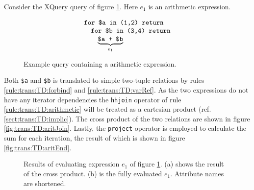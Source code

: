 \begin{myExample}
Consider the XQuery query of figure \ref{fig:trans:TD:arithQuery}. Here $e_1$ is an arithmetic expression.

\begin{figure}[h]
\centering
\begin{equation*}
\begin{array}{l}
\mbox{\texttt{for \$a in (1,2) return}} \\ \quad
\mbox{\texttt{for \$b in (3,4) return}} \\ \quad \quad
\underbrace{\mbox{\texttt{\$a + \$b}}}_{e_1}
\end{array}
\end{equation*}
\caption{Example query containing a arithmetic expression.}
\label{fig:trans:TD:arithQuery}
\end{figure}

Both \texttt{\$a} and \texttt{\$b} is translated to simple two-tuple relations by rules
\ref{rule:trans:TD:forbind} and \ref{rule:trans:TD:varRef}. As the two expressions do not have any iterator
dependencies the \texttt{hhjoin} operator of rule \ref{rule:trans:TD:arithmetic} will be treated as a cartesian
product (ref. \ref{sect:trans:TD:implic}). The cross product of the two relations are shown in figure
\ref{fig:trans:TD:aritJoin}. Lastly, the \texttt{project} operator is employed to calculate the sum for each
iteration, the result of which is shown in figure \ref{fig:trans:TD:aritEnd}.

\begin{figure}[h]
\centering
{}
\qquad
{}
\caption[Results of evaluating expression $e_1$ of figure \ref{fig:trans:TD:arithQuery}.]{Results of evaluating
expression $e_1$ of figure \ref{fig:trans:TD:arithQuery}. (a) shows the result of the cross product. (b) is the
fully evaluated $e_1$. Attribute names are shortened. \label{fig:trans:TD:arithRes}}
\end{figure}

\end{myExample}

